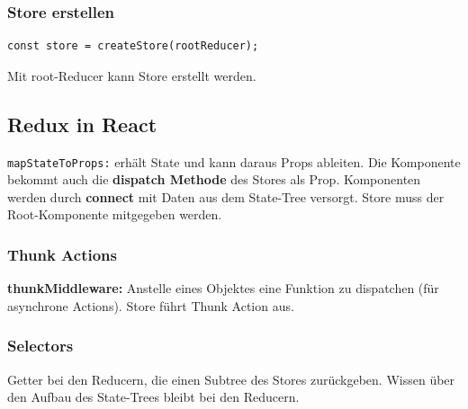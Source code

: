 \subsubsection{Store erstellen}
\begin{lstlisting}
const store = createStore(rootReducer);
\end{lstlisting}
Mit root-Reducer kann Store erstellt werden.

\subsection{Redux in React}
\texttt{\tiny mapStateToProps:} erhält State und kann daraus Props ableiten. Die Komponente bekommt auch die \textbf{dispatch Methode} des Stores als Prop. Komponenten werden durch \textbf{connect} mit Daten aus dem State-Tree versorgt. Store muss der Root-Komponente mitgegeben werden.

\subsubsection{Thunk Actions}
\textbf{thunkMiddleware:} Anstelle eines Objektes eine Funktion zu dispatchen (für asynchrone Actions). Store führt Thunk Action aus.

\subsubsection{Selectors}
Getter bei den Reducern, die einen Subtree des Stores zurückgeben. Wissen über den Aufbau des State-Trees bleibt bei den Reducern.
